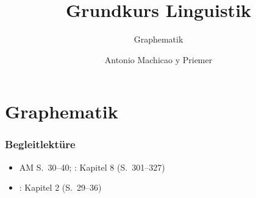 \togglefalse{uebung}


\title{Grundkurs Linguistik}

\subtitle{Graphematik}

\section{Graphematik}

\author[aMyP]{
	{\small Antonio Machicao y Priemer}
}



\date{ }




\huberlintitlepage[22pt]




\nocite{Brandt&Co06a}
\nocite{Glueck05a} 
\nocite{Luedeling2009} 
\nocite{Repp&Co15a}

\nocite{Altmann&Co07a}
\nocite{Fuhrhop08a}
\nocite{Fuhrhop09a}
\nocite{Fuhrhop&Co13a}

\begin{frame}
	\frametitle{Begleitlektüre}
	
	\begin{itemize}
		\item AM S.~30--40; \citet{Eisenberg04}: Kapitel 8 (S.~301--327)
		\item \citet{Meibauer&Co07a}: Kapitel 2 (S.~29--36)
	\end{itemize}
\end{frame}



